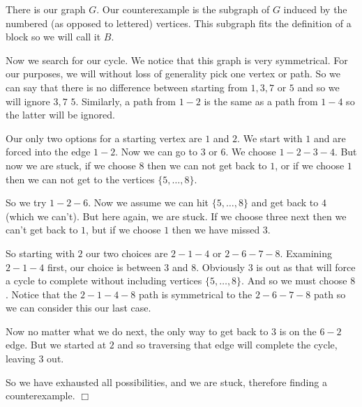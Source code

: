 \documentclass[letterpaper]{article}
\begin{document}
\begin{enumerate}
\begin{enumerate}
  There is our graph $G$. Our counterexample is the subgraph of $G$ induced by the numbered (as opposed to lettered) vertices. This subgraph fits the definition of a block so we will call it $B$.

  Now we search for our cycle. We notice that this graph is very symmetrical. For our purposes, we will without loss of generality pick one vertex or path. So we can say that there is no difference between starting from $1, 3, 7$ or $5$ and so we will ignore $3, 7$ $5$. Similarly, a path from $1-2$ is the same as a path from $1-4$ so the latter will be ignored.

  Our only two options for a starting vertex are $1$ and $2$. We start with $1$ and are forced into the edge $1-2$. Now we can go to $3$ or $6$. We choose $1-2-3-4$. But now we are stuck, if we choose $8$ then we can not get back to $1$, or if we choose $1$ then we can not get to the vertices $\{5,\dots,8\}$.

  So we try $1-2-6$. Now we assume we can hit $\{5,\dots,8\}$ and get back to $4$ (which we can't). But here again, we are stuck. If we choose three next then we can't get back to $1$, but if we choose $1$ then we have missed $3$.

  So starting with  $2$ our two choices are $2-1-4$ or $2-6-7-8$. Examining $2-1-4$ first, our choice is between $3$ and $8$. Obviously $3$ is out as that will force a cycle to complete without including vertices $\{5,\dots,8\}$. And so we must choose $8$. Notice that the $2-1-4-8$ path is symmetrical to the $2-6-7-8$ path so we can consider this our last case.

  Now no matter what we do next, the only way to get back to $3$ is on the $6-2$ edge. But we started at $2$ and so traversing that edge will complete the cycle, leaving $3$ out.

  So we have exhausted all possibilities, and we are stuck, therefore finding a counterexample. $\Box$
  

\end{enumerate}
\end{enumerate}
\end{document}
